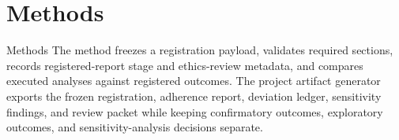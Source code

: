 \documentclass[
  ignorenonframetext,
]{beamer}
\author{\texorpdfstring{}{}}
\date{}
\begin{document}
\section{Methods}\label{methods}

\begin{frame}[allowframebreaks]{Methods}
The method freezes a registration payload, validates required sections,
records registered-report stage and ethics-review metadata, and compares
executed analyses against registered outcomes. The project artifact
generator exports the frozen registration, adherence report, deviation
ledger, sensitivity findings, and review packet while keeping
confirmatory outcomes, exploratory outcomes, and sensitivity-analysis
decisions separate.
\end{frame}
\end{document}
